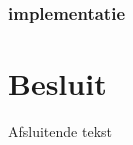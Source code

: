 \documentclass[a4paper,kulak]{kulakarticle}
\begin{document}
\subsubsection{implementatie}



\section*{Besluit}

Afsluitende tekst




\end{document}
